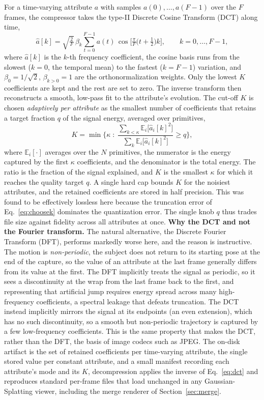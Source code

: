 For a time-varying attribute $a$ with samples $a(0),\dots,a(F-1)$ over the $F$ frames,
the compressor takes the type-II Discrete Cosine Transform (DCT) along time,
\begin{equation}
    \hat a[k] = \sqrt{\tfrac{2}{F}}\, \beta_k \sum_{t=0}^{F-1} a(t)\,
    \cos\!\Big[\tfrac{\pi}{F}\big(t + \tfrac{1}{2}\big)k\Big],
    \qquad k = 0,\dots,F-1,
    \label{eq:dct}
\end{equation}
where $\hat a[k]$ is the $k$-th frequency coefficient, the cosine basis runs from the
slowest ($k=0$, the temporal mean) to the fastest ($k = F-1$) variation, and
$\beta_0 = 1/\sqrt 2$, $\beta_{k>0} = 1$ are the orthonormalization weights. Only the
lowest $K$ coefficients are kept and the rest are set to zero. The inverse transform
then reconstructs a smooth, low-pass fit to the attribute's evolution. The cut-off $K$
is chosen \emph{adaptively per attribute} as the smallest number of coefficients that
retains a target fraction $q$ of the signal energy, averaged over primitives,
\begin{equation}
    K = \min\Big\{ \kappa \;:\; \frac{\sum_{k<\kappa} \mathbb{E}_i\big[\hat a_i[k]^2\big]}
    {\sum_{k} \mathbb{E}_i\big[\hat a_i[k]^2\big]} \ge q \Big\},
    \label{eq:choosek}
\end{equation}
where $\mathbb{E}_i[\cdot]$ averages over the $N$ primitives, the numerator is the
energy captured by the first $\kappa$ coefficients, and the denominator is the total
energy. The ratio is the fraction of the signal explained, and $K$ is the smallest
$\kappa$ for which it reaches the quality target $q$. A single hard cap bounds $K$ for
the noisiest attributes, and the retained coefficients are stored in half precision.
This was found to be effectively lossless here because the truncation error of
Eq.~\eqref{eq:choosek} dominates the quantization error. The single knob $q$ thus
trades file size against fidelity across all attributes at once. \textbf{Why the DCT and not the Fourier transform.} The natural alternative, the
Discrete Fourier Transform (DFT), performs markedly worse here, and the reason is
instructive. The motion is \emph{non-periodic}, the subject does not return to its
starting pose at the end of the capture, so the value of an attribute at the last
frame generally differs from its value at the first. The DFT implicitly treats the
signal as periodic, so it sees a discontinuity at the wrap from the last frame back to
the first, and representing that artificial jump requires energy spread across many
high-frequency coefficients, a spectral leakage that defeats truncation. The DCT
instead implicitly mirrors the signal at its endpoints (an even extension), which has
no such discontinuity, so a smooth but non-periodic trajectory is captured by a few
low-frequency coefficients. This is the same property that makes the DCT, rather than
the DFT, the basis of image codecs such as JPEG. The on-disk artifact is the set of
retained coefficients per time-varying attribute, the single stored value per constant
attribute, and a small manifest recording each attribute's mode and its $K$,
decompression applies the inverse of Eq.~\eqref{eq:dct} and reproduces standard
per-frame files that load unchanged in any Gaussian-Splatting viewer, including the
merge renderer of Section~\ref{sec:merge}.

